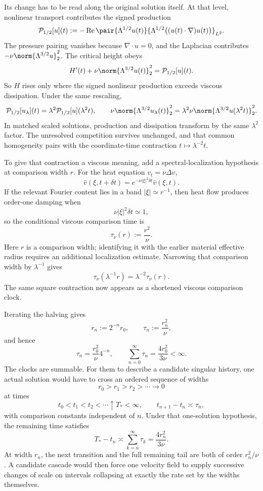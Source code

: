 
Its change has to be read along the original solution itself. At that level, nonlinear transport contributes the signed production
\[
  \mathcal P_{1/2}[u](t)
  :=
  -\operatorname{Re}
  \pair
    {\Lambda^{1/2}u(t)}
    {\Lambda^{1/2}\bigl((u(t)\cdot\nabla)u(t)\bigr)}_{L^2}.
\]
The pressure pairing vanishes because \(\nabla\cdot u=0\), and the Laplacian contributes \(-\nu\norm{\Lambda^{3/2}u}_2^2\). The critical height obeys
\[
  H'(t)
  +
  \nu\norm{\Lambda^{3/2}u(t)}_2^2
  =
  \mathcal P_{1/2}[u](t).
\]
So \(H\) rises only where the signed nonlinear production exceeds viscous dissipation. Under the same rescaling,
\[
  \mathcal P_{1/2}[u_\lambda](t)
  =
  \lambda^2\mathcal P_{1/2}[u](\lambda^2t),
  \qquad
  \nu\norm{\Lambda^{3/2}u_\lambda(t)}_2^2
  =
  \lambda^2\nu\norm{\Lambda^{3/2}u(\lambda^2t)}_2^2.
\]
In matched scaled solutions, production and dissipation transform by the same \(\lambda^2\) factor. The unresolved competition survives unchanged, and that common homogeneity pairs with the coordinate-time contraction \(t\mapsto\lambda^{-2}t\).


To give that contraction a viscous meaning, add a spectral-localization hypothesis at comparison width \(r\). For the heat equation \(v_t=\nu\Delta v\),
\[
  \widehat v(\xi,t+\delta t)
  =
  e^{-\nu|\xi|^2\delta t}\widehat v(\xi,t).
\]
If the relevant Fourier content lies in a band \(|\xi|\simeq r^{-1}\), then heat flow produces order-one damping when
\[
  \nu|\xi|^2\delta t\simeq1,
\]
so the conditional viscous comparison time is
\[
  \tau_\nu(r)
  :=
  \frac{r^2}{\nu}.
\]
Here \(r\) is a comparison width; identifying it with the earlier material effective radius requires an additional localization estimate. Narrowing that comparison width by \(\lambda^{-1}\) gives
\[
  \tau_\nu(\lambda^{-1}r)
  =
  \lambda^{-2}\tau_\nu(r).
\]
The same square contraction now appears as a shortened viscous comparison clock.


Iterating the halving gives
\[
  r_n:=2^{-n}r_0,
  \qquad
  \tau_n:=\frac{r_n^2}{\nu},
\]
and hence
\[
  \tau_n
  =
  \frac{r_0^2}{\nu}4^{-n},
  \qquad
  \sum_{n=0}^{\infty}\tau_n
  =
  \frac{4r_0^2}{3\nu}
  <
  \infty.
\]
The clocks are summable. For them to describe a candidate singular history, one actual \NavierStokes{} solution would have to cross an ordered sequence of widths
\[
  r_0>r_1>r_2>\cdots\longrightarrow0
\]
at times
\[
  t_0<t_1<t_2<\cdots\uparrow T_*<\infty,
  \qquad
  t_{n+1}-t_n\asymp\tau_n,
\]
with comparison constants independent of \(n\). Under that one-solution hypothesis, the remaining time satisfies
\[
  T_*-t_n
  \asymp
  \sum_{k=n}^{\infty}\tau_k
  =
  \frac{4r_n^2}{3\nu}.
\]
At width \(r_n\), the next transition and the full remaining tail are both of order \(r_n^2/\nu\). A candidate cascade would then force one velocity field to supply successive changes of scale on intervals collapsing at exactly the rate set by the widths themselves.